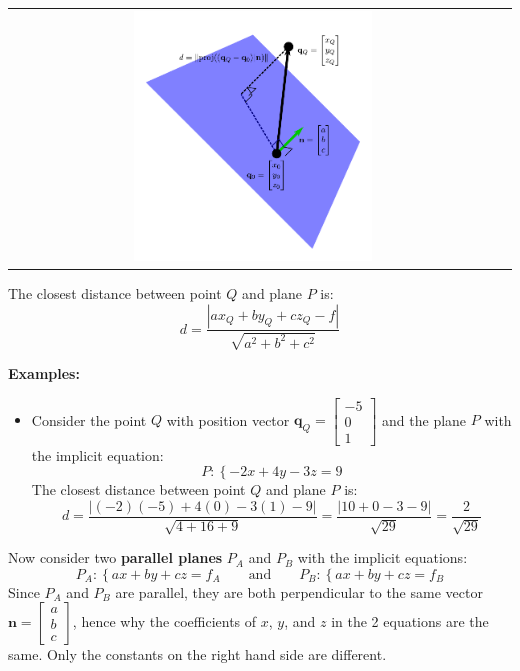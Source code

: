 \documentclass{article}
\begin{document}
\begin{tabular}{cc}
{\includegraphics[width = 0.5\textwidth]{point_plane_closest_distance}
}
\end{tabular}
The closest distance between point \(Q\) and plane \(P\) is: 
\[d = \frac{|a x_Q + b y_Q + c z_Q - f|}{\sqrt{a^2 + b^2 + c^2}}\]

\textbf{Examples:}
\begin{itemize}
\item Consider the point \(Q\) with position vector \(\mathbf{q}_Q = \begin{bmatrix} -5 \\ 0 \\ 1 \end{bmatrix}\) and the plane \(P\) with the implicit equation:
\[P : \left\{-2x + 4y - 3z = 9\right.\] 
The closest distance between point \(Q\) and plane \(P\) is: 
\[d = \frac{|(-2)(-5) + 4(0) - 3(1) - 9|}{\sqrt{4 + 16 + 9}} = \frac{|10 + 0 - 3 - 9|}{\sqrt{29}} = \frac{2}{\sqrt{29}}\]
\end{itemize}


\vspace{5mm}

Now consider two {\bf parallel planes} \(P_A\) and \(P_B\) with the implicit equations:
\[P_A : \left\{a x + b y + c z  = f_A\right. \quad\quad\text{and}\quad\quad P_B : \left\{a x + b y + c z  = f_B\right.\]
Since \(P_A\) and \(P_B\) are parallel, they are both perpendicular to the same vector \(\mathbf{n} = \begin{bmatrix} a \\ b \\ c \end{bmatrix}\), hence why the coefficients of \(x\), \(y\), and \(z\) in the 2 equations are the same. Only the constants on the right hand side are different.  
\end{document}
